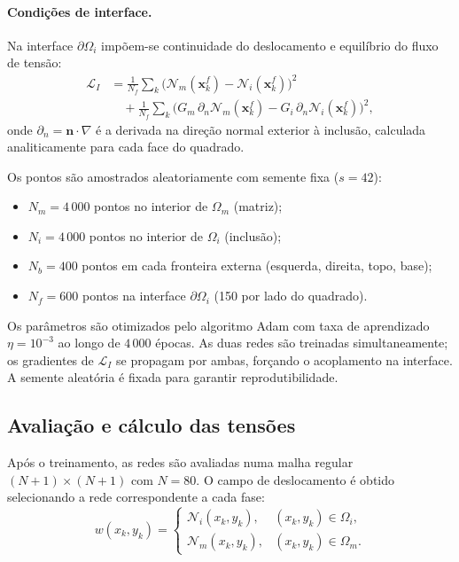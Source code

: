 \documentclass[brazil]{TCAM} %
\begin{document}
\paragraph{Condições de interface.}
Na interface $\partial\Omega_i$ impõem-se continuidade do deslocamento e equilíbrio
do fluxo de tensão:
\begin{equation}
\begin{aligned}
    \mathcal{L}_{I}
    &= \frac{1}{N_f}\sum_k
      \bigl(\mathcal{N}_m(\mathbf{x}_k^f) - \mathcal{N}_i(\mathbf{x}_k^f)\bigr)^2 \\
    &\quad + \frac{1}{N_f}\sum_k
      \bigl(G_m\,\partial_n \mathcal{N}_m(\mathbf{x}_k^f)
           - G_i\,\partial_n \mathcal{N}_i(\mathbf{x}_k^f)\bigr)^2,
\end{aligned}
\end{equation}
onde $\partial_n = \mathbf{n}\cdot\nabla$ é a derivada na direção normal exterior à
inclusão, calculada analiticamente para cada face do quadrado.

Os pontos são amostrados aleatoriamente com semente fixa ($s = 42$):
\begin{itemize}
    \item $N_m = 4\,000$ pontos no interior de $\Omega_m$ (matriz);
    \item $N_i = 4\,000$ pontos no interior de $\Omega_i$ (inclusão);
    \item $N_b = 400$ pontos em cada fronteira externa (esquerda, direita, topo, base);
    \item $N_f = 600$ pontos na interface $\partial\Omega_i$ (150 por lado do quadrado).
\end{itemize}

Os parâmetros são otimizados pelo algoritmo Adam \cite{kingma2015adam} com taxa de
aprendizado $\eta = 10^{-3}$ ao longo de $4\,000$ épocas. As duas redes são
treinadas simultaneamente; os gradientes de $\mathcal{L}_I$ se propagam por ambas,
forçando o acoplamento na interface. A semente aleatória é fixada para garantir
reprodutibilidade.

\subsection{Avaliação e cálculo das tensões}

Após o treinamento, as redes são avaliadas numa malha regular $(N+1)\times(N+1)$
com $N = 80$. O campo de deslocamento é obtido selecionando a rede correspondente
a cada fase:
\begin{equation*}
    w(x_k, y_k) =
    \begin{cases}
        \mathcal{N}_i(x_k,y_k), & (x_k,y_k) \in \Omega_i, \\
        \mathcal{N}_m(x_k,y_k), & (x_k,y_k) \in \Omega_m.
    \end{cases}
\end{equation*}
\end{document}
